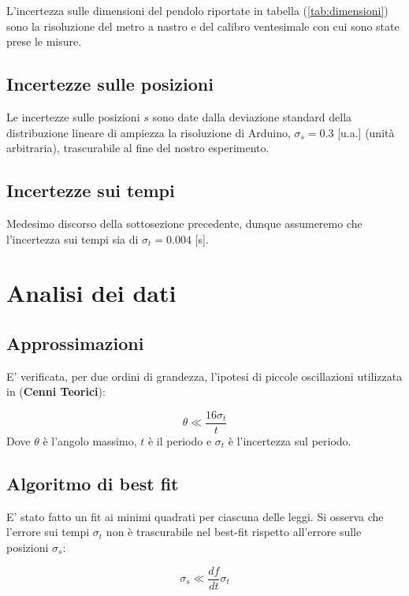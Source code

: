 \documentclass{article}
\begin{document}
                L'incertezza sulle dimensioni del pendolo riportate in tabella (\ref{tab:dimensioni}) sono la risoluzione del metro a nastro e del calibro ventesimale con cui sono state prese le misure.

                
		\subsection{Incertezze sulle posizioni}
  
                Le incertezze sulle posizioni $s$ sono date dalla deviazione standard della distribuzione lineare di ampiezza la risoluzione di Arduino, $\sigma_s=0.3$ [u.a.] (unità arbitraria), trascurabile al fine del nostro esperimento.
		
            \subsection{Incertezze sui tempi}
  
                Medesimo discorso della sottosezione precedente, dunque assumeremo che l'incertezza sui tempi sia di $\sigma_t=0.004$ [s].

    
\section{Analisi dei dati}

            \subsection{ Approssimazioni}
                E' verificata, per due ordini di grandezza, l'ipotesi di piccole oscillazioni utilizzata in (\textbf{Cenni Teorici}):

\begin{equation}
\theta \ll \frac{16\sigma_t}{t}
\label{verifica}
\end{equation}
Dove $\theta$ è l'angolo massimo, $ t$ è il periodo e $\sigma_t$ è l'incertezza sul periodo.
\subsection{Algoritmo di best fit}
    
    E' stato fatto un fit ai minimi quadrati per ciascuna delle leggi.
    Si osserva che l'errore sui tempi $\sigma_t$ non è trascurabile nel best-fit rispetto all'errore sulle posizioni $\sigma_s$:
    
    $$ \sigma_s\ll \frac{df}{dt}\sigma_t $$
    
\end{document}
